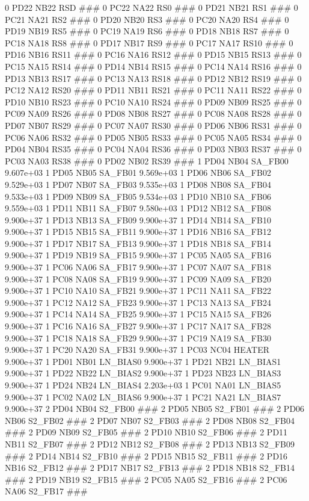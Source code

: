 0 PD22 NB22 RSD ### 
0 PC22 NA22 RS0 ### 
0 PD21 NB21 RS1 ### 
0 PC21 NA21 RS2 ### 
0 PD20 NB20 RS3 ### 
0 PC20 NA20 RS4 ### 
0 PD19 NB19 RS5 ### 
0 PC19 NA19 RS6 ### 
0 PD18 NB18 RS7 ### 
0 PC18 NA18 RS8 ### 
0 PD17 NB17 RS9 ### 
0 PC17 NA17 RS10 ### 
0 PD16 NB16 RS11 ### 
0 PC16 NA16 RS12 ### 
0 PD15 NB15 RS13 ### 
0 PC15 NA15 RS14 ### 
0 PD14 NB14 RS15 ### 
0 PC14 NA14 RS16 ### 
0 PD13 NB13 RS17 ### 
0 PC13 NA13 RS18 ### 
0 PD12 NB12 RS19 ### 
0 PC12 NA12 RS20 ### 
0 PD11 NB11 RS21 ### 
0 PC11 NA11 RS22 ### 
0 PD10 NB10 RS23 ### 
0 PC10 NA10 RS24 ### 
0 PD09 NB09 RS25 ### 
0 PC09 NA09 RS26 ### 
0 PD08 NB08 RS27 ### 
0 PC08 NA08 RS28 ### 
0 PD07 NB07 RS29 ### 
0 PC07 NA07 RS30 ### 
0 PD06 NB06 RS31 ### 
0 PC06 NA06 RS32 ### 
0 PD05 NB05 RS33 ### 
0 PC05 NA05 RS34 ### 
0 PD04 NB04 RS35 ### 
0 PC04 NA04 RS36 ### 
0 PD03 NB03 RS37 ### 
0 PC03 NA03 RS38 ### 
0 PD02 NB02 RS39 ### 
1 PD04 NB04 SA_FB00 9.607e+03 
1 PD05 NB05 SA_FB01 9.569e+03 
1 PD06 NB06 SA_FB02 9.529e+03 
1 PD07 NB07 SA_FB03 9.535e+03 
1 PD08 NB08 SA_FB04 9.533e+03 
1 PD09 NB09 SA_FB05 9.534e+03 
1 PD10 NB10 SA_FB06 9.559e+03 
1 PD11 NB11 SA_FB07 9.580e+03 
1 PD12 NB12 SA_FB08 9.900e+37 
1 PD13 NB13 SA_FB09 9.900e+37 
1 PD14 NB14 SA_FB10 9.900e+37 
1 PD15 NB15 SA_FB11 9.900e+37 
1 PD16 NB16 SA_FB12 9.900e+37 
1 PD17 NB17 SA_FB13 9.900e+37 
1 PD18 NB18 SA_FB14 9.900e+37 
1 PD19 NB19 SA_FB15 9.900e+37 
1 PC05 NA05 SA_FB16 9.900e+37 
1 PC06 NA06 SA_FB17 9.900e+37 
1 PC07 NA07 SA_FB18 9.900e+37 
1 PC08 NA08 SA_FB19 9.900e+37 
1 PC09 NA09 SA_FB20 9.900e+37 
1 PC10 NA10 SA_FB21 9.900e+37 
1 PC11 NA11 SA_FB22 9.900e+37 
1 PC12 NA12 SA_FB23 9.900e+37 
1 PC13 NA13 SA_FB24 9.900e+37 
1 PC14 NA14 SA_FB25 9.900e+37 
1 PC15 NA15 SA_FB26 9.900e+37 
1 PC16 NA16 SA_FB27 9.900e+37 
1 PC17 NA17 SA_FB28 9.900e+37 
1 PC18 NA18 SA_FB29 9.900e+37 
1 PC19 NA19 SA_FB30 9.900e+37 
1 PC20 NA20 SA_FB31 9.900e+37 
1 PC03 NC04 HEATER 9.900e+37 
1 PD01 NB01 LN_BIAS0 9.900e+37 
1 PD21 NB21 LN_BIAS1 9.900e+37 
1 PD22 NB22 LN_BIAS2 9.900e+37 
1 PD23 NB23 LN_BIAS3 9.900e+37 
1 PD24 NB24 LN_BIAS4 2.203e+03 
1 PC01 NA01 LN_BIAS5 9.900e+37 
1 PC02 NA02 LN_BIAS6 9.900e+37 
1 PC21 NA21 LN_BIAS7 9.900e+37 
2 PD04 NB04 S2_FB00 ### 
2 PD05 NB05 S2_FB01 ### 
2 PD06 NB06 S2_FB02 ### 
2 PD07 NB07 S2_FB03 ### 
2 PD08 NB08 S2_FB04 ### 
2 PD09 NB09 S2_FB05 ### 
2 PD10 NB10 S2_FB06 ### 
2 PD11 NB11 S2_FB07 ### 
2 PD12 NB12 S2_FB08 ### 
2 PD13 NB13 S2_FB09 ### 
2 PD14 NB14 S2_FB10 ### 
2 PD15 NB15 S2_FB11 ### 
2 PD16 NB16 S2_FB12 ### 
2 PD17 NB17 S2_FB13 ### 
2 PD18 NB18 S2_FB14 ### 
2 PD19 NB19 S2_FB15 ### 
2 PC05 NA05 S2_FB16 ### 
2 PC06 NA06 S2_FB17 ### 
